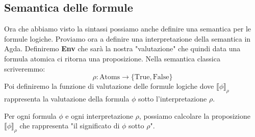 \documentclass[a4paper]{article}
\theoremstyle{definition}
\theoremstyle{remark}
\begin{document}
\subsection{Semantica delle formule}

Ora che abbiamo visto la sintassi 
possiamo anche definire una semantica per le formule logiche.
Proviamo ora a definire 
una interpretazione della semantica in Agda.
Definiremo \textbf{Env} che sarà la nostra "valutazione" 
che quindi data una formula atomica ci ritorna una proposizione.
Nella semantica classica scriveremmo: 
\[  
\rho : \text{Atoms} \to \{\text{True}, \text{False}\}
\]
Poi definiremo la funzione di valutazione delle formule logiche
dove \(\llbracket \phi \rrbracket_{\rho}\) rappresenta la valutazione della formula \( \phi \) sotto l'interpretazione \( \rho \).
\begin{Observation}{}{}{}
  Per ogni formula $\phi$ e ogni interpretazione $\rho$, possiamo calcolare la proposizione $\llbracket \phi \rrbracket_{\rho}$ che rappresenta "il significato di $\phi$ sotto $\rho$".
\end{Observation}
\end{document}
